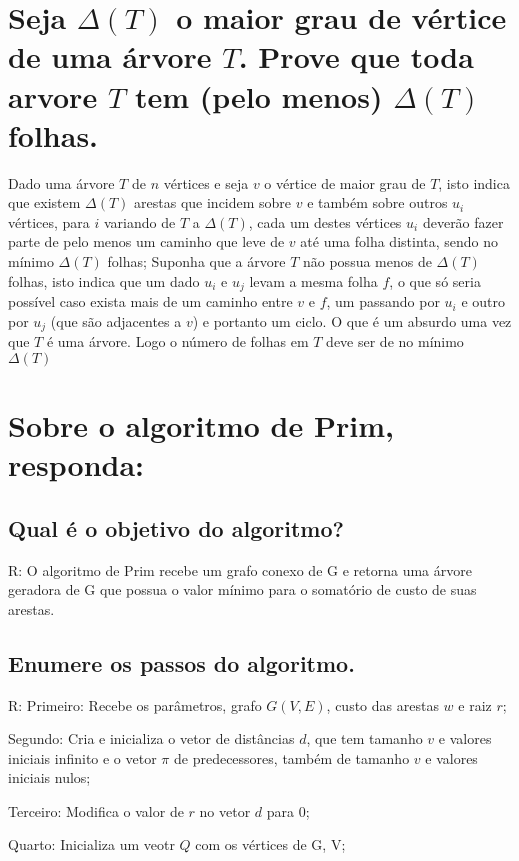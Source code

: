 \documentclass[final,3p,12pt]{elsarticle}
\begin{document}
\section{Seja $\Delta(T)$ o maior grau de vértice de uma árvore $T$. Prove que toda arvore $T$ tem (pelo menos) $\Delta(T)$ folhas.}
	\label{S:2}
	Dado uma árvore $T$ de $n$ vértices e seja $v$ o vértice de maior grau de $T$, isto indica que existem $\Delta(T)$ arestas que incidem sobre $v$ e também sobre outros $u_i$ vértices, para $i$ variando de $T$ a $\Delta(T)$, cada um destes vértices $u_i$ deverão fazer parte de pelo menos um caminho que leve de $v$ até uma folha distinta, sendo no mínimo $\Delta(T)$ folhas;
	Suponha que a árvore $T$ não possua menos de $\Delta(T)$ folhas, isto indica que um dado $u_i$ e $u_j$ levam a mesma folha $f$, o que só seria possível caso exista mais de um caminho entre $v$ e $f$, um passando por $u_i$ e outro por $u_j$ (que são adjacentes a $v$) e portanto um ciclo. O que é um absurdo uma vez que $T$ é uma árvore. Logo o número de folhas em $T$ deve ser de no mínimo $\Delta(T)$

\section{Sobre o algoritmo de Prim, responda:}
	\label{S:3}
	
	\subsection{Qual é o objetivo do algoritmo?}
		
		R: O algoritmo de Prim recebe um grafo conexo de G e retorna uma árvore geradora de G que possua o valor mínimo para o somatório de custo de suas arestas.
	
	\subsection{Enumere os passos do algoritmo.}

		R: 	Primeiro:
			Recebe os parâmetros, grafo $G(V,E)$, custo das arestas $w$ e raiz $r$;

			Segundo:
			Cria e inicializa o vetor de distâncias $d$, que tem tamanho $v$ e valores iniciais infinito e o vetor $\pi$ de predecessores, também de tamanho $v$ e valores iniciais nulos;

			Terceiro:
			Modifica o valor de $r$ no vetor $d$ para 0;

			Quarto:
			Inicializa um veotr $Q$ com os vértices de G, V;
\end{document}
